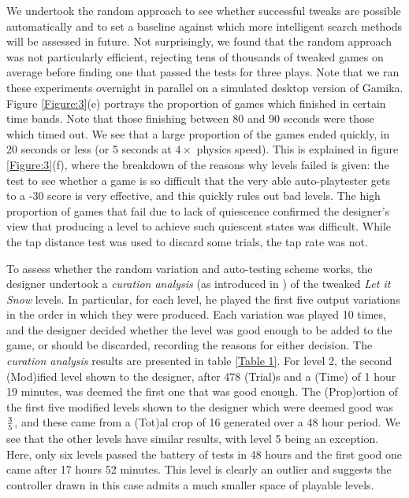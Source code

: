 \documentclass{IEEEtran}
\begin{document}
We undertook the random approach to see whether successful tweaks are possible automatically and to set a baseline against which more intelligent search methods will be assessed in future. Not surprisingly, we found that the random approach was not particularly efficient, rejecting tens of thousands of tweaked games on average before finding one that passed the tests for three plays. Note that we ran these experiments overnight in parallel on a simulated desktop version of Gamika. Figure \ref{Figure:3}(e) portrays the proportion of games which finished in certain time bands. Note that those finishing between 80 and 90 seconds were those which timed out. We see that a large proportion of the games ended quickly, in 20 seconds or less (or 5 seconds at $4\times$ physics speed). This is explained in figure \ref{Figure:3}(f), where the breakdown of the reasons why levels failed is given: the test to see whether a game is so difficult that the very able auto-playtester gets to a -30 score is very effective, and this quickly rules out bad levels. The high proportion of games that fail due to lack of quiescence confirmed the designer's view that producing a level to achieve such quiescent states was difficult. While the tap distance test was used to discard some trials, the tap rate was not.

To assess whether the random variation and auto-testing scheme works, the designer undertook a \emph{curation analysis} (as introduced in \cite{colton:ecai12}) of the tweaked \emph{Let it Snow} levels. In particular, for each level, he played the first five output variations in the order in which they were produced. Each variation was played 10 times, and the designer decided whether the level was good enough to be added to the game, or should be discarded, recording the reasons for either decision. The \emph{curation analysis} results are presented in table \ref{Table 1}. For level 2, the second (Mod)ified level shown to the designer, after 478 (Trial)s and a (Time) of 1 hour 19 minutes, was deemed the first one that was good enough. The (Prop)ortion of the first five modified levels shown to the designer which were deemed good was $3\over5$, and these came from a (Tot)al crop of 16 generated over a 48 hour period. We see that the other levels have similar results, with level 5 being an exception. Here, only six levels passed the battery of tests in 48 hours and the first good one came after 17 hours 52 minutes. This level is clearly an outlier and suggests the controller drawn in this case admits a much smaller space of playable levels.
\end{document}
